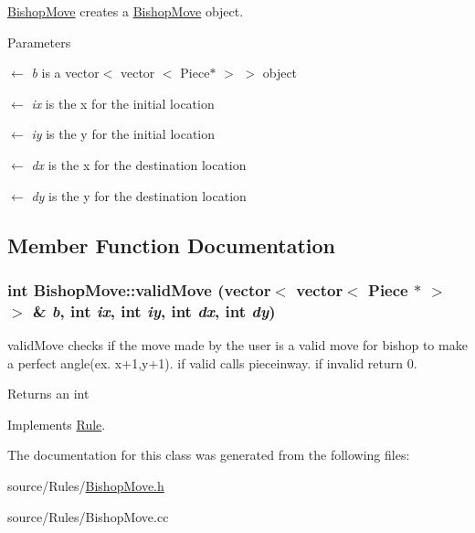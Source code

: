 \hyperlink{classBishopMove}{BishopMove} creates a \hyperlink{classBishopMove}{BishopMove} object. 
\begin{DoxyParams}{Parameters}
\item[\mbox{$\leftarrow$} {\em b}]is a vector$<$ vector $<$ Piece$\ast$ $>$ $>$ object \item[\mbox{$\leftarrow$} {\em ix}]is the x for the initial location \item[\mbox{$\leftarrow$} {\em iy}]is the y for the initial location \item[\mbox{$\leftarrow$} {\em dx}]is the x for the destination location \item[\mbox{$\leftarrow$} {\em dy}]is the y for the destination location \end{DoxyParams}


\subsection{Member Function Documentation}
\hypertarget{classBishopMove_a30929c42136a677d9531d21696fd2c82}{
\subsubsection[{validMove}]{\setlength{\rightskip}{0pt plus 5cm}int BishopMove::validMove (vector$<$ vector$<$ {\bf Piece} $\ast$ $>$ $>$ \& {\em b}, \/  int {\em ix}, \/  int {\em iy}, \/  int {\em dx}, \/  int {\em dy})}}
\label{classBishopMove_a30929c42136a677d9531d21696fd2c82}


validMove checks if the move made by the user is a valid move for bishop to make a perfect angle(ex. x+1,y+1). if valid calls pieceinway. if invalid return 0. \begin{DoxyReturn}{Returns}
an int 
\end{DoxyReturn}


Implements \hyperlink{classRule}{Rule}.

The documentation for this class was generated from the following files:\begin{DoxyCompactItemize}
\item 
source/Rules/\hyperlink{BishopMove_8h}{BishopMove.h}\item 
source/Rules/BishopMove.cc\end{DoxyCompactItemize}

